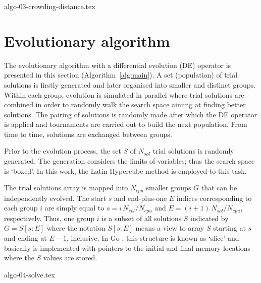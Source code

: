 \documentclass[final,5p,times,twocolumn]{elsarticle}
\begin{document}
{algo-03-crowding-distance.tex}



\section{Evolutionary algorithm}
\label{sec:EA}

The evolutionary algorithm with a differential evolution (DE) operator is presented in this section
(Algorithm~\ref{alg:main}). A set (population) of trial solutions is firstly generated and later
organised into smaller and distinct groups. Within each group, evolution is simulated in parallel
where trial solutions are combined in order to randomly walk the search space aiming at finding
better solutions. The pairing of solutions is randomly made after which the DE operator is applied
and tournaments are carried out to build the next population. From time to time, solutions are
exchanged between groups.

Prior to the evolution process, the set $S$ of $N_{sol}$ trial solutions is randomly generated. The
generation considers the limits of variables; thus the search space is `boxed'. In this work, the
Latin Hypercube method is employed to this task.

The trial solutions array is mapped into $N_{cpu}$ smaller groups $G$ that can be independently
evolved. The start $s$ and end-plus-one $E$ indices corresponding to each group $i$ are simply equal
to $s = {i\,N_{sol}}/{N_{cpu}}$ and $E = {(i+1)\,N_{sol}}/{N_{cpu}}$, respectively. Thus, one group
$i$ is a subset of all solutions $S$ indicated by ${G = S[s:E]}$ where the notation $S[s:E]$ means a
view to array $S$ starting at $s$ and ending at $E-1$, inclusive. In Go \citep{golang:16}, this
structure is known as `slice' and basically is implemented with pointers to the initial and final
memory locations where the $S$ values are stored.


{algo-04-solve.tex}
\end{document}
